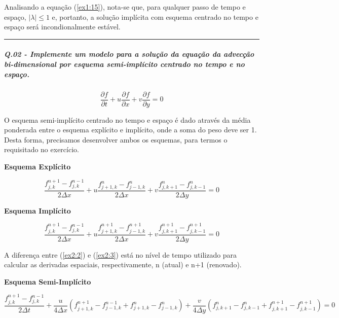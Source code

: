 \documentclass[11pt]{article}
\begin{document}
Analisando a equação (\ref{ex1:15}), nota-se que, para qualquer passo de
tempo e espaço, \(|\lambda| \le 1\) e, portanto, a solução implícita com
esquema centrado no tempo e espaço será incondionalmente estável.

    \begin{center}\rule{0.5\linewidth}{\linethickness}\end{center}

    \subparagraph{Q.02 - Implemente um modelo para a solução da equação da
advecção bi-dimensional por esquema semi-implícito centrado no tempo e
no
espaço.}

\begin{equation}
    \frac{\partial{f}}{\partial{t}} + u\frac{\partial{f}}{\partial{x}} + v\frac{\partial{f}}{\partial{y}} = 0
    \label{ex2:1}
\end{equation}

O esquema semi-implícito centrado no tempo e espaço é dado através da
média ponderada entre o esquema explícito e implícito, onde a soma do
peso deve ser 1. Desta forma, precisamos desenvolver ambos os esquemas,
para termos o requisitado no exercício.

\textbf{Esquema Explícito}

\begin{equation}
    \frac{ f^{n+1}_{j,k} - f^{n-1}_{j,k} }{2\Delta{x}} + u\frac{ f^{n}_{j+1,k} - f^{n}_{j-1,k} }{2\Delta{x}} + v\frac{f^{n}_{j,k+1} - f^{n}_{j,k-1}}{2\Delta{y}} = 0
    \label{ex2:2}
\end{equation}

\textbf{Esquema Implícito}

\begin{equation}
    \frac{ f^{n+1}_{j,k} - f^{n-1}_{j,k} }{2\Delta{x}} + u\frac{ f^{n+1}_{j+1,k} - f^{n+1}_{j-1,k} }{2\Delta{x}} + v\frac{f^{n+1}_{j,k+1} - f^{n+1}_{j,k-1}}{2\Delta{y}} = 0
    \label{ex2:3}
\end{equation}

A diferença entre (\ref{ex2:2}) e (\ref{ex2:3}) está no nível de tempo
utilizado para calcular as derivadas espaciais, respectivamente, n
(atual) e n+1 (renovado).

\textbf{Esquema Semi-Implícito}

\begin{equation}
    \frac{f^{n+1}_{j,k} - f^{n-1}_{j,k}}{2\Delta{t}} + \frac{u}{4\Delta{x}}(f^{n+1}_{j+1,k} - f^{n-1}_{j-1,k} + f^{n}_{j+1,k} - f^{n}_{j-1,k}) + \frac{v}{4\Delta{y}}( f^{n}_{j,k+1} - f^{n}_{j,k-1} + f^{n+1}_{j,k+1} -f^{n+1}_{j,k-1} ) = 0
    \label{ex2:4}
\end{equation}
\end{document}
